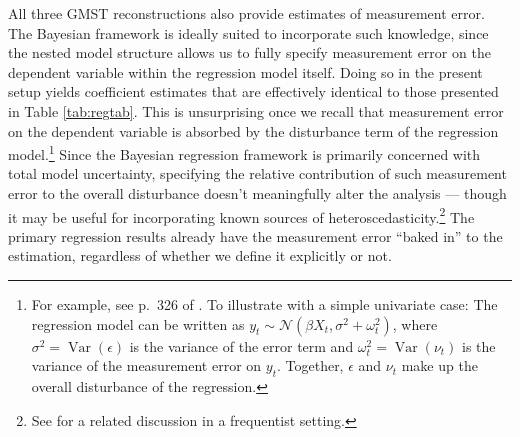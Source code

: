 \documentclass[smallextended]{svjour3}       %
\begin{document}
All three GMST reconstructions also provide estimates of measurement
error. The Bayesian framework is ideally suited to incorporate such
knowledge, since the nested model structure allows us to fully specify
measurement error on the dependent variable within the regression model
itself. Doing so in the present setup yields coefficient estimates that
are effectively identical to those presented in Table \ref{tab:regtab}.
This is unsurprising once we recall that measurement error on the
dependent variable is absorbed by the disturbance term of the regression
model.\footnote{For example, see p.~326 of \cite{greene2007econometric}.
  To illustrate with a simple univariate case: The regression model can
  be written as
  \(y_t \sim \mathcal{N}(\beta X_t, \sigma^2 + \omega_t^2)\), where
  \(\sigma^2 = \mathop{\mathrm{Var}}(\epsilon)\) is the variance of the
  error term and \(\omega_t^2 = \mathop{\mathrm{Var}}(\nu_t)\) is the
  variance of the measurement error on \(y_t\). Together, \(\epsilon\)
  and \(\nu_t\) make up the overall disturbance of the regression.}
Since the Bayesian regression framework is primarily concerned with
total model uncertainty, specifying the relative contribution of such
measurement error to the overall disturbance doesn't meaningfully alter
the analysis --- though it may be useful for incorporating known sources
of heteroscedasticity.\footnote{See \cite{lewis2005edv} for a related
  discussion in a frequentist setting.} The primary regression results
already have the measurement error ``baked in'' to the estimation,
regardless of whether we define it explicitly or not.
\end{document}
